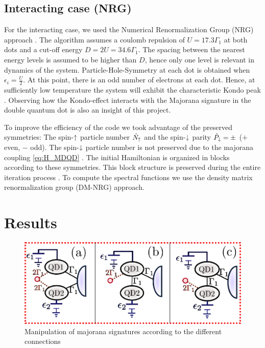 \documentclass[showpacs,aps,prb,reprint,superscriptaddress]{revtex4-1}
\begin{document}
\subsection{Interacting case (NRG)}
For the interacting case, we used the Numerical Renormalization Group (NRG) approach \cite{wilson_renormalization_1975,sindel_numerical_2005,bulla_numerical_2008}. The algorithm assumes a coulomb repulsion of $U =17.3\Gamma_1$ at both dots and a cut-off energy $D=2U=34.6\Gamma_1$. The spacing between the nearest energy levels is assumed to be higher than $D$, hence only one level is relevant in dynamics of the system. Particle-Hole-Symmetry at each dot is obtained when  $\epsilon_i = \frac{U}{2}$. At this point, there is an odd number of electrons at each dot. Hence, at sufficiently low temperature the system will exhibit the characteristic Kondo peak \citet{wilson_renormalization_1975}. Observing how the Kondo-effect interacts with the Majorana signature in the double quantum dot is also an insight of this project. 


To  improve the efficiency of the code we took advantage of the preserved symmetries: The spin-$\uparrow$ particle number $\hat{N}_\uparrow$ and the spin-$\downarrow$ parity $\hat{P}_\downarrow = \pm $ ($+$ even, $-$ odd). The spin-$\downarrow$ particle number is not preserved due to the majorana coupling \eqref{eq:H_MDQD} . The initial Hamiltonian is organized in blocks according to these symmetries. This block structure is preserved during the entire iteration process \cite{bulla_numerical_2008}. To compute the spectral functions we use the density matrix renormalization group (DM-NRG) approach. \cite{hofstetter_generalized_2000}
  
 \section{Results}
\begin{figure}[bt]
\begin{center}
\includegraphics[scale=0.5]{Graficos/MajoranaModels.png}
\caption{\label{fig:MajoranaModels}  Manipulation of majorana signatures according to the different connections
}
%
\end{center}
\end{figure}
\end{document}
